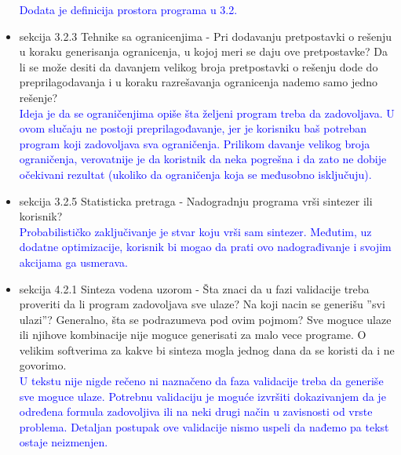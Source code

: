 \documentclass[a4paper]{report}
\newcommand{\odgovor}[1]{\textcolor{blue}{#1}}
\begin{document}
\begin{itemize}
    \odgovor {Dodata je definicija prostora programa u 3.2.}
    \item sekcija 3.2.3 Tehnike sa ogranicenjima - Pri dodavanju pretpostavki o rešenju u koraku generisanja ogranicenja, u kojoj meri se daju ove pretpostavke? Da li se može desiti da davanjem velikog broja pretpostavki o rešenju dode do preprilagodavanja i u koraku razrešavanja ogranicenja nademo samo jedno rešenje?\\
    \odgovor {Ideja je da se ograničenjima opiše šta željeni program treba da zadovoljava. U ovom slučaju ne postoji preprilagođavanje, jer je korisniku baš potreban program koji zadovoljava sva ograničenja. Prilikom davanje velikog broja ograničenja, verovatnije je da koristnik da neka pogrešna i da zato ne dobije očekivani rezultat (ukoliko da ograničenja koja se međusobno isključuju).}
    \item sekcija 3.2.5 Statisticka pretraga - Nadogradnju programa vrši sintezer ili korisnik?\\
    \odgovor {Probabilističko zaključivanje je stvar koju vrši sam sintezer. Međutim, uz dodatne optimizacije, korisnik bi mogao da prati ovo nadograđivanje i svojim akcijama ga usmerava.}
    \item sekcija 4.2.1 Sinteza vodena uzorom - Šta znaci da u fazi validacije treba proveriti da li program zadovoljava sve ulaze? Na koji nacin se generišu ''svi ulazi''? Generalno, šta se podrazumeva pod ovim pojmom? Sve moguce ulaze ili njihove kombinacije nije moguce generisati za malo vece programe. O velikim softverima za kakve bi sinteza mogla jednog dana da se koristi da i ne govorimo.\\
	\odgovor{U tekstu nije nigde rečeno ni naznačeno da faza validacije treba da generiše sve moguce ulaze. Potrebnu validaciju je moguće izvršiti dokazivanjem da je određena formula zadovoljiva ili na neki drugi način u zavisnosti od vrste problema. Detaljan postupak ove validacije nismo uspeli da nađemo pa tekst ostaje neizmenjen.}
\end{itemize}
\end{document}

